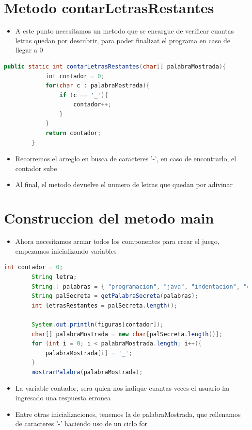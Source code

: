 \documentclass{article}
\begin{document}
        \section{Metodo contarLetrasRestantes}
        \begin{itemize}
            \item A este punto necesitamos un metodo que se encargue de verificar cuantas letras quedan por descubrir, para poder finalizat el programa en caso de llegar a 0
        \end{itemize}
            \begin{lstlisting}[language=java, caption={Metodo contarLetrasRestantes}]
        public static int contarLetrasRestantes(char[] palabraMostrada){
            int contador = 0;
            for(char c : palabraMostrada){
                if (c == '_'){
                    contador++;
                }
            }
            return contador;
        }
            \end{lstlisting}
        \begin{itemize}
            \item Recorremos el arreglo en busca de caracteres '-', en caso de encontrarlo, el contador sube
            \item Al final, el metodo devuelve el numero de letras que quedan por adivinar
            
        \end{itemize}
        
        \section{Construccion del metodo main}
        \begin{itemize}
            \item Ahora necesitamos armar todos los componentes para crear el juego, empezamos inicializando variables
        \end{itemize}
        \begin{lstlisting}[language=java, caption={Metodo display()}]
        int contador = 0;
        String letra;
        String[] palabras = { "programacion", "java", "indentacion", "clases", "objetos", "desarrollador", "pruebas", "test", "pruebita"};
        String palSecreta = getPalabraSecreta(palabras);
        int letrasRestantes = palSecreta.length();

        System.out.println(figuras[contador]);
        char[] palabraMostrada = new char[palSecreta.length()];
        for (int i = 0; i < palabraMostrada.length; i++){
            palabraMostrada[i] = '_';
        }
        mostrarPalabra(palabraMostrada);
        \end{lstlisting}
        \begin{itemize}
            \item La variable contador, sera quien nos indique cuantas veces el usuario ha ingresado una respuesta erronea
            \item Entre otras inicializaciones, tenemos la de palabraMostrada, que rellenamos de caracteres '-' haciendo uso de un ciclo for
        \end{itemize}
\end{document}
